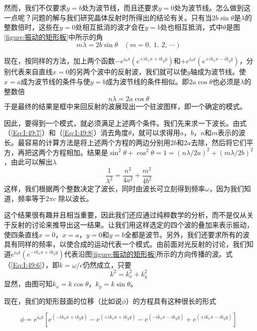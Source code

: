 然而，我们不仅要求$y=b$处为波节线，而且还要求$y=0$处为波节线。怎么做到这一点呢？问题的解与我们研究晶体反射时所得出的结论有关。只有当$2b\sin\theta$是$\lambda$的整数倍时，这些在$y=0$处相互抵消的波才会在$y=b$处也相互抵消，式中$\theta$是图\ref{figure:振动的矩形板}中所示的角
\begin{equation}
    \label{Eq:I:49:7}
    m\lambda = 2b\sin\theta ~~~~ (m = 0,~1,~2,~\cdots)
\end{equation}

现在，按同样的方法，加上两个函数$-e^{i\omega t}(e^{+ik_xx+ik_yy})$和$+e^{i\omega t}(e^{+ik_xx-ik_yy})$，分别代表来自直线$x=0$的另两个波中的反射波，我们就可以使$y$轴成为波节线。使$x=a$成为波节线的条件与使$y=b$成为波节线的条件相似。即$2a\cos\theta$也必须是$\lambda$的整数倍
\begin{equation}
    \label{Eq:I:49:8}
    n\lambda = 2a\cos\theta
\end{equation}
于是最终的结果是框中来回反射的波展现出一个驻波图样，即一个确定的模式。

因此，要得到一个模式，就必须满足上述两个条件。我们先来求一下波长。由式（\ref{Eq:I:49:7}）和（\ref{Eq:I:49:8}）消去角度$\theta$，就可以求得用$a$，$b$，$n$和$m$表示的波长。最容易的计算方法是将上述两个方程的两边分别用$2b$和$2a$去除，然后将它们平方，再把这两个方程相加。结果是$\sin^2\theta +\cos^2\theta=1=(n\lambda /2a)^2 +(m\lambda/2b)^2$，由此可以解出$\lambda$
\begin{equation}
    \label{Eq:I:49:9}
    \frac{1}{\lambda^2} = \frac{n^2}{4a^2} + \frac{m^2}{4b^2}
\end{equation}
这样，我们根据两个整数决定了波长，同时由波长可立刻得到频率$\omega$，因为我们知道，频率等于$2\pi c$ 除以波长。

这个结果很有趣并且相当重要，因此我们还应通过纯粹数学的分析，而不是仅从关于反射的讨论来推导出这一结果。让我们用这样选定的四个波的叠加来表示振动，使四条直线$x=0$，$x=a$，$y=0$和$y=b$全都是波节。另外，我们还要求所有的波具有同样的频率，以使合成的运动代表一个模式。由前面对光反射的讨论，我们知道$e^{i\omega t}(e^{-ik_xx+ik_yy})$代表沿图\ref{figure:振动的矩形板}所示的方向传播的波。式（\ref{Eq:I:49:6}），即$k =\omega /c$仍然成立，只要
\begin{equation}
    \label{Eq:I:49:10}
    k^2 = k_x^2 + k_y^2
\end{equation}
显然，由图可知$k_x =k\cos\theta$，$k_y =k\sin\theta$。

现在，我们的矩形鼓面的位移（比如说$\phi$）的方程具有这种很长的形式

\begin{equation}
    \label{Eq:I:49:11a}
    \tag{49.11a}
    \phi = e^{i\omega t} \left[e^{(-ik_xx+ik_yy)}-e^{(+ik_xx+ik_yy)}-e^{(-ik_xx-ik_yy)}+e^{(+ik_xx-ik_yy)}\right]
\end{equation}

